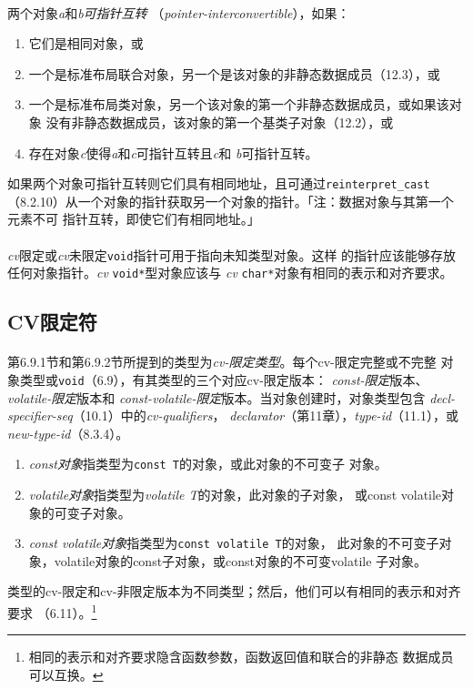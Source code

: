 \paragraph{}
两个对象\textit{a}和\textit{b}\textit{可指针互转}
（\textit{pointer-interconvertible}），如果：
\begin{enumerate}
  \item{它们是相同对象，或}
  \item{一个是标准布局联合对象，另一个是该对象的非静态数据成员（12.3），或}
  \item{一个是标准布局类对象，另一个该对象的第一个非静态数据成员，或如果该对象
    没有非静态数据成员，该对象的第一个基类子对象（12.2），或}
  \item{存在对象\textit{c}使得\textit{a}和\textit{c}可指针互转且\textit{c}和
    \textit{b}可指针互转。}
\end{enumerate}
如果两个对象可指针互转则它们具有相同地址，且可通过\texttt{reinterpret\_cast}
（8.2.10）从一个对象的指针获取另一个对象的指针。「注：数据对象与其第一个元素不可
指针互转，即使它们有相同地址。」

\paragraph{}
\textit{cv}限定或\textit{cv}未限定\texttt{void}指针可用于指向未知类型对象。这样
的指针应该能够存放任何对象指针。\textit{cv} \texttt{void*}型对象应该与
\textit{cv} \texttt{char*}对象有相同的表示和对齐要求。
\subsection{CV限定符}
\paragraph{}
第6.9.1节和第6.9.2节所提到的类型为\textit{cv-限定类型}。每个cv-限定完整或不完整
对象类型或\texttt{void}（6.9），有其类型的三个对应cv-限定版本：
\textit{const-限定}版本、\textit{volatile-限定}版本和
\textit{const-volatile-限定}版本。当对象创建时，对象类型包含
\textit{decl-specifier-seq}（10.1）中的\textit{cv-qualifiers}，
\textit{declarator}（第11章），\textit{type-id}（11.1），或
\textit{new-type-id}（8.3.4）。
\begin{enumerate}
  \item{\textit{const对象}指类型为\texttt{const T}的对象，或此对象的不可变子
    对象。}
  \item{\textit{volatile对象}指类型为\textit{volatile T}的对象，此对象的子对象，
    或const volatile对象的可变子对象。}
  \item{\textit{const volatile对象}指类型为\texttt{const volatile T}的对象，
    此对象的不可变子对象，volatile对象的const子对象，或const对象的不可变volatile
    子对象。}
\end{enumerate}
类型的cv-限定和cv-非限定版本为不同类型；然后，他们可以有相同的表示和对齐要求
（6.11）。\footnote{相同的表示和对齐要求隐含函数参数，函数返回值和联合的非静态
数据成员可以互换。}


